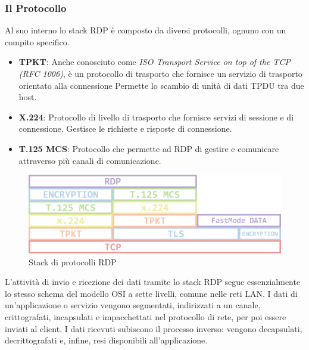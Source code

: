 \documentclass[12pt,a4paper,openright,twoside]{book}
\begin{document}
\subsubsection{Il Protocollo}
Al suo interno lo stack \ac{RDP} è composto da diversi protocolli, ognuno con un compito specifico.
\begin{itemize}
    \item \textbf{TPKT}: Anche conosciuto come \emph{ISO Transport Service on top of the TCP (RFC 1006)}, è un protocollo di trasporto che fornisce un servizio di trasporto orientato alla connessione
     Permette lo scambio di unità di dati \ac{TPDU} tra due host.
    \item \textbf{X.224}: Protocollo di livello di trasporto che fornisce servizi di sessione e di connessione. Gestisce le richieste e risposte di connessione.
    \item \textbf{T.125 MCS}: Protocollo che permette ad \ac{RDP} di gestire e comunicare attraverso più canali di comunicazione.
\end{itemize}

\begin{figure}
    \centering
    \includegraphics[width=.5\linewidth]{figures/3-protocol_stack-768x239.png}
    \caption[xarch]{Stack di protocolli \ac{RDP} \footnotemark}
\end{figure}

L'attività di invio e ricezione dei dati tramite lo stack \ac{RDP} segue essenzialmente lo stesso schema del modello OSI a sette livelli,
comune nelle reti \ac{LAN}.
%
I dati di un'applicazione o servizio vengono segmentati,
indirizzati a un canale, crittografati,
incapsulati e impacchettati nel protocollo di rete, per poi essere inviati al client.
%
I dati ricevuti subiscono il processo inverso: vengono decapsulati, decrittografati e, infine, resi disponibili all'applicazione.
\end{document}
